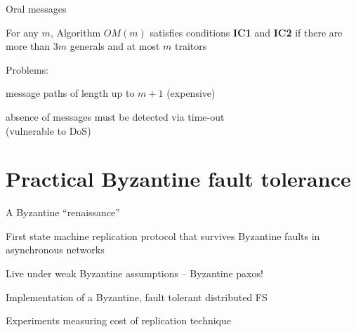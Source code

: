 \begin{frame}{Oral messages}
	
\begin{theorem}
For any $m$, Algorithm $OM(m)$ satisfies conditions \textbf{IC1} and \textbf{IC2} if there are more than $3m$ generals and at most $m$ traitors
\end{theorem}

\bigskip
\BIL
\item Problems:
\BI
\item message paths of length up to $m+1$  (expensive)
\item absence of messages must be detected via time-out\\ (vulnerable to DoS)	
\EI
\EIL


\end{frame}

\section{Practical Byzantine fault tolerance}

\begin{frame}{A Byzantine “renaissance”}
		
\begin{Bib}
\end{Bib}	

\smallskip
{}
\BIL
\item First state machine replication protocol that survives Byzantine faults in asynchronous networks
\item Live under weak Byzantine assumptions – Byzantine paxos!
\item Implementation of a Byzantine, fault tolerant distributed FS
\item Experiments measuring cost of replication technique
\EIL
		
\end{frame}

